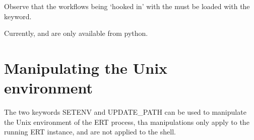 \documentclass[a4paper,10pt,english]{sphinxmanual}
\begin{document}
Observe that the workflows being ‘hooked in’ with the  must
be loaded with the  keyword.

Currently,  and  are only available from
python.


\section{Manipulating the Unix environment}
\label{\detokenize{keywords/index:manipulating-the-unix-environment}}\label{\detokenize{keywords/index:id17}}
The two keywords SETENV and UPDATE\_PATH can be used to manipulate the Unix
environment of the ERT process, tha manipulations only apply to the running ERT
instance, and are not applied to the shell.
\end{document}
